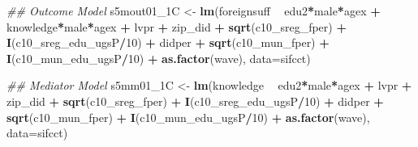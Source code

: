 \documentclass[
]{article}
\newenvironment{Shaded}{\begin{snugshade}}{\end{snugshade}}
\newcommand{\CommentTok}[1]{\textcolor[rgb]{0.56,0.35,0.01}{\textit{#1}}}
\newcommand{\DataTypeTok}[1]{\textcolor[rgb]{0.13,0.29,0.53}{#1}}
\newcommand{\DecValTok}[1]{\textcolor[rgb]{0.00,0.00,0.81}{#1}}
\newcommand{\KeywordTok}[1]{\textcolor[rgb]{0.13,0.29,0.53}{\textbf{#1}}}
\newcommand{\NormalTok}[1]{#1}
\newcommand{\OperatorTok}[1]{\textcolor[rgb]{0.81,0.36,0.00}{\textbf{#1}}}
\newcommand{\StringTok}[1]{\textcolor[rgb]{0.31,0.60,0.02}{#1}}
\begin{document}
\begin{Shaded}
\begin{Highlighting}[]
\CommentTok{## Outcome Model }
\NormalTok{s5mout01_1C <-}\StringTok{ }\KeywordTok{lm}\NormalTok{(foreignsuff  }\OperatorTok{~}\StringTok{ }\NormalTok{edu2}\OperatorTok{*}\NormalTok{male}\OperatorTok{*}\NormalTok{agex }\OperatorTok{+}\StringTok{ }\NormalTok{knowledge}\OperatorTok{*}\NormalTok{male}\OperatorTok{*}\NormalTok{agex }\OperatorTok{+}\StringTok{ }\NormalTok{lvpr }\OperatorTok{+}\StringTok{  }
\StringTok{                    }\NormalTok{zip_did }\OperatorTok{+}\StringTok{ }\KeywordTok{sqrt}\NormalTok{(c10_sreg_fper) }\OperatorTok{+}\StringTok{ }\KeywordTok{I}\NormalTok{(c10_sreg_edu_ugsP}\OperatorTok{/}\DecValTok{10}\NormalTok{) }\OperatorTok{+}\StringTok{ }
\StringTok{                    }\NormalTok{didper }\OperatorTok{+}\StringTok{ }\KeywordTok{sqrt}\NormalTok{(c10_mun_fper) }\OperatorTok{+}\StringTok{ }\KeywordTok{I}\NormalTok{(c10_mun_edu_ugsP}\OperatorTok{/}\DecValTok{10}\NormalTok{) }\OperatorTok{+}\StringTok{ }
\StringTok{                    }\KeywordTok{as.factor}\NormalTok{(wave), }\DataTypeTok{data=}\NormalTok{sifcct)}

\CommentTok{## Mediator Model}
\NormalTok{s5mm01_1C <-}\StringTok{ }\KeywordTok{lm}\NormalTok{(knowledge  }\OperatorTok{~}\StringTok{ }\NormalTok{edu2}\OperatorTok{*}\NormalTok{male}\OperatorTok{*}\NormalTok{agex }\OperatorTok{+}\StringTok{ }\NormalTok{lvpr }\OperatorTok{+}\StringTok{  }
\StringTok{                  }\NormalTok{zip_did }\OperatorTok{+}\StringTok{ }\KeywordTok{sqrt}\NormalTok{(c10_sreg_fper) }\OperatorTok{+}\StringTok{ }\KeywordTok{I}\NormalTok{(c10_sreg_edu_ugsP}\OperatorTok{/}\DecValTok{10}\NormalTok{) }\OperatorTok{+}\StringTok{ }
\StringTok{                  }\NormalTok{didper }\OperatorTok{+}\StringTok{ }\KeywordTok{sqrt}\NormalTok{(c10_mun_fper) }\OperatorTok{+}\StringTok{ }\KeywordTok{I}\NormalTok{(c10_mun_edu_ugsP}\OperatorTok{/}\DecValTok{10}\NormalTok{) }\OperatorTok{+}\StringTok{ }
\StringTok{                  }\KeywordTok{as.factor}\NormalTok{(wave), }\DataTypeTok{data=}\NormalTok{sifcct)}


\end{Highlighting}
\end{Shaded}
\end{document}
